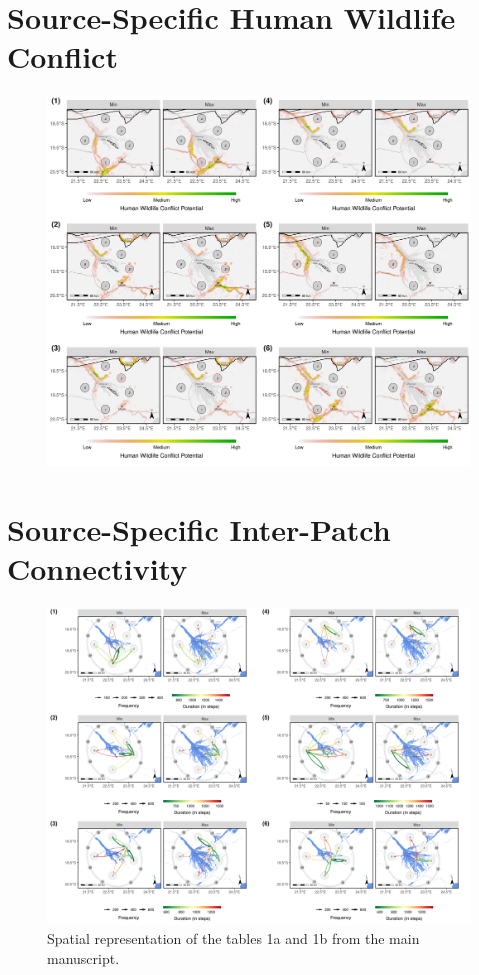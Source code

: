 \documentclass[abstract=on,10pt,a4paper,bibliography=totocnumbered]{article}
\begin{document}
\newpage
\section{Source-Specific Human Wildlife Conflict}
\begin{figure}[htbp]
  \begin{center}
  \includegraphics[width = \textwidth]{99_HumanWildlifeConflictIndividual.png}
  \caption{}
  \label{HWC}
  \end{center}
\end{figure}

\newpage
\section{Source-Specific Inter-Patch Connectivity}
\begin{figure}[htbp]
  \begin{center}
  \includegraphics[width = \textwidth]{99_IPCMain.png}
  \caption{Spatial representation of the tables 1a and 1b from the main
  manuscript.}
  \label{IPCMain}
  \end{center}
\end{figure}
\end{document}
